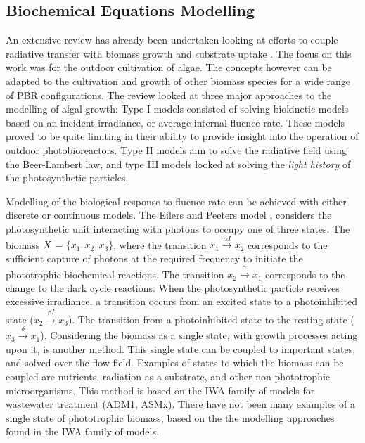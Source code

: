\subsection{Biochemical Equations Modelling}
\label{S:3.3}
An extensive review has already been undertaken looking at efforts to couple radiative transfer with biomass growth and substrate uptake \cite{bechet2013}. The focus on this work was for the outdoor cultivation of algae. The concepts however can be adapted to the cultivation and growth of other biomass species for a wide range of PBR configurations. The review looked at three major approaches to the modelling of algal growth: Type I models consisted of solving biokinetic models based on an incident irradiance, or average internal fluence rate. These models proved to be quite limiting in their ability to provide insight into the operation of outdoor photobioreactors. Type II models aim to solve the radiative field using the Beer-Lambert law, and type III models looked at solving the \textit{light history} of the photosynthetic particles.

\skippingparagraph
Modelling of the biological response to fluence rate can be achieved with either discrete or continuous models. The Eilers and Peeters model \cite{eilers1988}, considers the photosynthetic unit interacting with photons to occupy one of three states. The biomass $X \,= \{x_1, x_2, x_3\}$, where the transition $x_1 \xrightarrow{\alpha I} x_2$ corresponds to the sufficient capture of photons at the required frequency to initiate the phototrophic biochemical reactions. The transition $x_2 \xrightarrow{\gamma} x_1$ corresponds to the change to the dark cycle reactions. When the photosynthetic particle receives excessive irradiance, a transition occurs from an excited state to a photoinhibited state ($x_2 \xrightarrow{\beta I} x_3$). The transition from a photoinhibited state to the resting state ($x_3 \xrightarrow{\delta} x_1$). %
\skippingparagraph
Considering the biomass as a single state, with growth processes acting upon it, is another method. This single state can be coupled to important states, and solved over the flow field. Examples of states to which the biomass can be coupled are nutrients, radiation as a substrate, and other non phototrophic microorganisms. This method is based on the IWA family of models for wastewater treatment (ADM1, ASMx). There have not been many examples of a single state of phototrophic biomass, based on the the modelling approaches found in the IWA family of models. %

